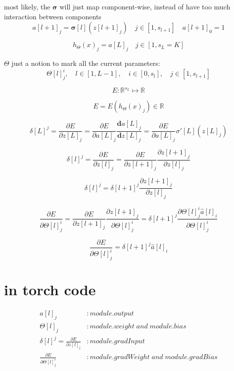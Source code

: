 \documentclass[12pt,a4paper]{article}
\begin{document}
most likely, the $\mathbf{\sigma}$ will just map component-wise, instead of have too much interaction between components
\[
a[l+1]_{j} = \mathbf{\sigma}[l](z[l+1]_j)  \quad j \in [1,s_{l+1}] \quad a[l+1]_0 = 1
\]


\[
h_{\Theta}(x)_j = a[L]_j \quad j \in [1,s_L=K]
\]

$\Theta$ just a notion to mark all the current parameters:
\[
\Theta[l]^{i}_{j}, \quad l \in [1,L-1], \quad i \in [0,s_l], \quad j \in [1,s_{l+1}]
\]


\[
E:\mathbb{R}^{s_L} \mapsto \mathbb{R}
\]

\[
E = E(h_\Theta(x)_j) \in \mathbb{R}
\]

\[
\delta[L]^j = \frac{\partial E}{\partial z[L]_j} = \frac{\partial E}{\partial a[L]_j}\frac{\mathbf{d} a[L]_j}{\mathbf{d}z[L]_j} = \frac{\partial E}{\partial a[L]_j}\mathbb{\sigma'}[L](z[L]_j)
\]

\[
\delta[l]^j = \frac{\partial E}{\partial z[l]_j} = \frac{\partial E}{\partial z[l+1]_j}\frac{\partial z[l+1]_j}{\partial z[l]_j}
\]

\[
\delta[l]^j = \delta[l+1]^j\frac{\partial z[l+1]_j}{\partial z[l]_j}
\]

\[
\frac{\partial E}{\partial \Theta[l]^{i}_{j}}=\frac{\partial E}{\partial z[l+1]_j}\frac{\partial z[l+1]_j}{\partial \Theta[l]^{i}_{j}}
=\delta[l+1]^j\frac{\partial \Theta[l]^{i}_{j}\hat{a}[l]_{i}}{\partial \Theta[l]^{i}_{j}}
\]

\[
\frac{\partial E}{\partial \Theta[l]^{i}_{j}}=\delta[l+1]^j\hat{a}[l]_{i}
\]

\section{in torch code}

\begin{align*}
a[l]_j &: module.output \\
\Theta[l]_j &: module.weight\; and\; module.bias \\
\delta[l]^j = \frac{\partial E}{\partial z[l]_j} &: module.gradInput \\
\frac{\partial E}{\partial \Theta[l]^{i}_{j}}  &: module.gradWeight\; and\; module.gradBias
\end{align*}
\end{document}
